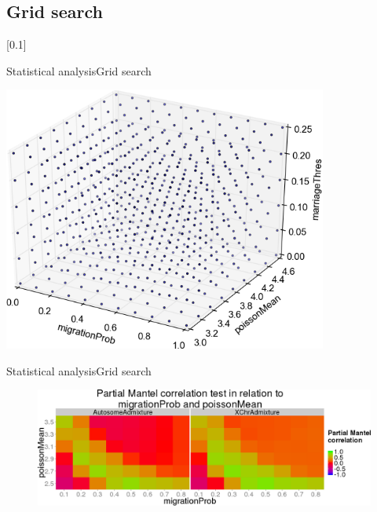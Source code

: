 \documentclass[10pt, aspectratio=43]{beamer}
\begin{document}
\subsection{Grid search}
[0.1]{}{}{}
\begin{frame}{Statistical analysis}{Grid search}
\begin{center}
  \includegraphics[width=0.8\textwidth]{../data/grid.png}
\end{center}
\end{frame}

\begin{frame}{Statistical analysis}{Grid search}
\begin{center}
  \begin{figure}
    \includegraphics[width=1\textwidth]{../data/sensit-comp-2d-preview.png}
  \end{figure}
\end{center}
\end{frame}
\end{document}
